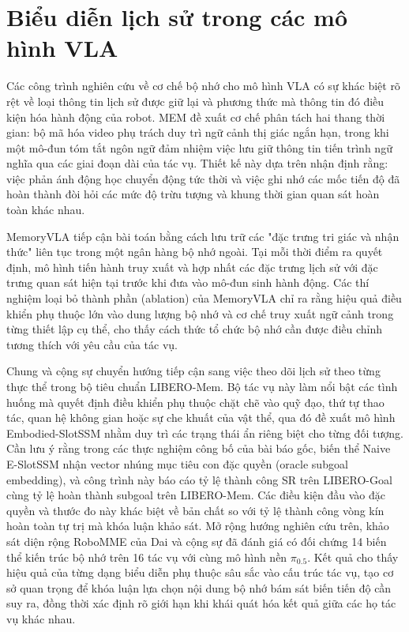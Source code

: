 \section{Biểu diễn lịch sử trong các mô hình VLA}

Các công trình nghiên cứu về cơ chế bộ nhớ cho mô hình VLA có sự khác biệt rõ rệt về loại thông tin lịch sử được giữ lại và phương thức mà thông tin đó điều kiện hóa hành động của robot. MEM \cite{mem2026} đề xuất cơ chế phân tách hai thang thời gian: bộ mã hóa video phụ trách duy trì ngữ cảnh thị giác ngắn hạn, trong khi một mô-đun tóm tắt ngôn ngữ đảm nhiệm việc lưu giữ thông tin tiến trình ngữ nghĩa qua các giai đoạn dài của tác vụ. Thiết kế này dựa trên nhận định rằng: việc phản ánh động học chuyển động tức thời và việc ghi nhớ các mốc tiến độ đã hoàn thành đòi hỏi các mức độ trừu tượng và khung thời gian quan sát hoàn toàn khác nhau.

MemoryVLA \cite{memoryvla2026} tiếp cận bài toán bằng cách lưu trữ các "đặc trưng tri giác và nhận thức" liên tục trong một ngân hàng bộ nhớ ngoài. Tại mỗi thời điểm ra quyết định, mô hình tiến hành truy xuất và hợp nhất các đặc trưng lịch sử với đặc trưng quan sát hiện tại trước khi đưa vào mô-đun sinh hành động. Các thí nghiệm loại bỏ thành phần (ablation) của MemoryVLA chỉ ra rằng hiệu quả điều khiển phụ thuộc lớn vào dung lượng bộ nhớ và cơ chế truy xuất ngữ cảnh trong từng thiết lập cụ thể, cho thấy cách thức tổ chức bộ nhớ cần được điều chỉnh tương thích với yêu cầu của tác vụ.

Chung và cộng sự \cite{liberomem2025} chuyển hướng tiếp cận sang việc theo dõi lịch sử theo từng thực thể trong bộ tiêu chuẩn LIBERO-Mem. Bộ tác vụ này làm nổi bật các tình huống mà quyết định điều khiển phụ thuộc chặt chẽ vào quỹ đạo, thứ tự thao tác, quan hệ không gian hoặc sự che khuất của vật thể, qua đó đề xuất mô hình Embodied-SlotSSM nhằm duy trì các trạng thái ẩn riêng biệt cho từng đối tượng. Cần lưu ý rằng trong các thực nghiệm công bố của bài báo gốc, biến thể Naive E-SlotSSM nhận vector nhúng mục tiêu con đặc quyền (oracle subgoal embedding), và công trình này báo cáo tỷ lệ thành công SR trên LIBERO-Goal cùng tỷ lệ hoàn thành subgoal trên LIBERO-Mem. Các điều kiện đầu vào đặc quyền và thước đo này khác biệt về bản chất so với tỷ lệ thành công vòng kín hoàn toàn tự trị mà khóa luận khảo sát. Mở rộng hướng nghiên cứu trên, khảo sát diện rộng RoboMME của Dai và cộng sự \cite{robomme2026} đã đánh giá có đối chứng 14 biến thể kiến trúc bộ nhớ trên 16 tác vụ với cùng mô hình nền $\pi_{0.5}$. Kết quả cho thấy hiệu quả của từng dạng biểu diễn phụ thuộc sâu sắc vào cấu trúc tác vụ, tạo cơ sở quan trọng để khóa luận lựa chọn nội dung bộ nhớ bám sát biến tiến độ cần suy ra, đồng thời xác định rõ giới hạn khi khái quát hóa kết quả giữa các họ tác vụ khác nhau.

